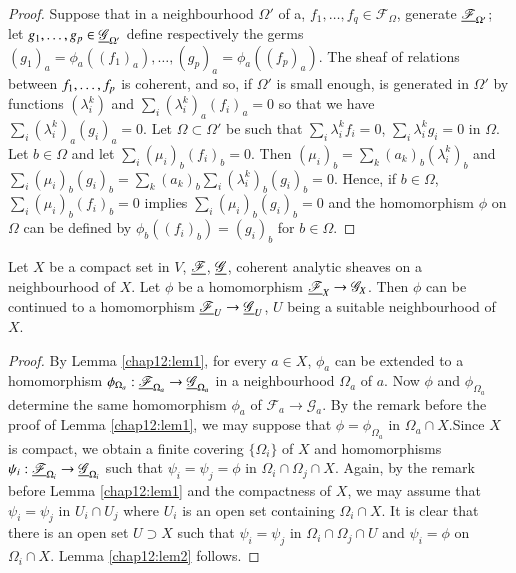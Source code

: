 \begin{proof}
Suppose that in a neighbourhood $\Omega'$ of a, $f_1, \ldots, f_q \in
\mathscr{F}_\Omega$, generate $\underline{\mathscr{F}}_{\Omega'}$; let $g_1,
\ldots, g_p \in \underline{\mathscr{G}}_{\Omega'}$ define respectively the
germs $(g_1)_a = \phi_a((f_1)_a), \ldots, (g_p)_a =
\phi_a((f_p)_a)$. The sheaf of relations between $f_1, \ldots,\break f_p$ is
coherent, and so, if $\Omega'$ is small enough, is generated in
$\Omega'$ by functions $(\lambda^k_i)$ and $\sum\limits_i
(\lambda^k_i)_a(f_i)_a = 0$ so that we have $\sum\limits_i
(\lambda^k_i)_a (g_i)_a = 0$. Let $\Omega \subset \Omega'$ be such
that $\sum\limits_i \lambda^k_i f_i = 0$, $\sum\limits_i \lambda^k_i
g_i =0$ in $\Omega$. Let $ b\in \Omega$ and let $\sum\limits_i
(\mu_i)_b (f_i)_b = 0$. Then $(\mu_i)_b = \sum\limits_k (a_k)_b
(\lambda^k_i)_b$ and $\sum\limits_i  (\mu_i)_b (g_i)_b  =
\sum\limits_k (a_k)_b \sum\limits_i (\lambda^k_i)_b (g_i)_b =
0$. Hence, if $b \in \Omega$, $\sum\limits_i (\mu_i)_b (f_i)_b = 0$
implies $\sum\limits_i (\mu_i)_b (g_i)_b =0$ and the homomorphism
$\phi$ on $\Omega$ can be defined by $\phi_b ((f_i)_b) = (g_i)_b$ for
$b \in \Omega$. 
\end{proof}

\begin{lem}\label{chap12:lem2}
Let $X$ be a compact set in $V$, $\underline{\mathscr{F}}$, $\underline{\mathscr{G}}$,
coherent analytic sheaves on a neighbourhood of $X$. Let $\phi$ be a
homomorphism $\underline{\mathscr{F}}_X \to \mathscr{G}_X$. Then $\phi$ can be
continued to a homomorphism $\underline{\mathscr{F}}_U \to
\underline{\mathscr{G}}_U$, $U$ being a suitable neighbourhood of $X$. 
\end{lem}

\begin{proof}
By Lemma \ref{chap12:lem1}, for every $a \in X$, $\phi_a$ can be extended to a
homomorphism $\phi_{\Omega_a} : \underline{\mathscr{F}}_{\Omega_a} \to
\underline{\mathscr{G}}_{\Omega_a}$ in a neighbourhood $\Omega_a$ of $a$. Now
$\phi$ and $\phi_{\Omega_a}$ determine the same homomorphism $\phi_a$
of $\mathscr{F}_a \to \mathscr{G}_a$. By the remark before the proof
of Lemma \ref{chap12:lem1}, we may suppose that $\phi = \phi_{\Omega_a}$ in $\Omega_a
\cap X$.\pageoriginale Since $X$ is compact, we obtain a finite
covering $\{\Omega_i\}$ of $X$ and homomorphisms $\psi_i :
\underline{\mathscr{F}}_{\Omega_i} \to \underline{\mathscr{G}}_{\Omega_i}$ such that
$\psi_i = \psi_j =\phi$ in $\Omega_i \cap \Omega_j \cap X$. Again, by
the remark before Lemma \ref{chap12:lem1} and the compactness of $X$, we may assume
that $\psi_i = \psi_j$ in $U_i \cap U_j$ where $U_i$ is an open set
containing $\Omega_i \cap X$. It is clear that there is an open set $U
\supset X$ such that $\psi_i = \psi_j$ in $\Omega_i \cap \Omega_j \cap
U$ and $\psi_i = \phi$ on $\Omega_i \cap X$. Lemma \ref{chap12:lem2} follows. 
\end{proof}

